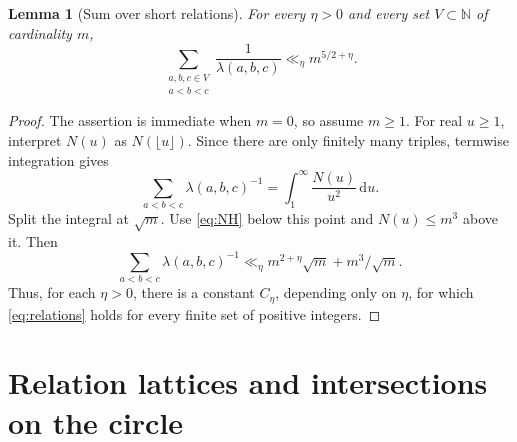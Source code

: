 \documentclass[12pt,leqno]{article}
\numberwithin{equation}{section}
\newtheorem{lemma}[theorem]{Lemma}
\theoremstyle{remark}
\newcommand{\LRnatural}{\mathbb N}
\newcommand{\LRdifferential}{\,\mathrm d}
\begin{document}
\begin{lemma}[Sum over short relations]\label{lem:relations}
For every $\eta>0$ and every set $V\subset\LRnatural$ of cardinality $m$,
\begin{equation}\label{eq:relations}
\sum_{\substack{a,b,c\in V\\a<b<c}}\frac1{\lambda(a,b,c)}
\ll_\eta m^{5/2+\eta}.
\end{equation}
\end{lemma}
\begin{proof}
The assertion is immediate when $m=0$, so assume $m\ge1$. For real $u\ge1$, interpret $N(u)$ as $N(\lfloor u\rfloor)$. Since there are only finitely many triples, termwise integration gives
\[
\sum_{a<b<c}\lambda(a,b,c)^{-1}
=\int_1^\infty\frac{N(u)}{u^2}\LRdifferential u.
\]
Split the integral at $\sqrt m$. Use \eqref{eq:NH} below this point and $N(u)\le m^3$ above it. Then
\[
\sum_{a<b<c}\lambda(a,b,c)^{-1}
\ll_\eta m^{2+\eta}\sqrt m+m^3/\sqrt m.
\]
Thus, for each $\eta>0$, there is a constant $C_\eta$, depending only on $\eta$, for which \eqref{eq:relations} holds for every finite set of positive integers.

\end{proof}

\section{Relation lattices and intersections on the circle}
\end{document}

